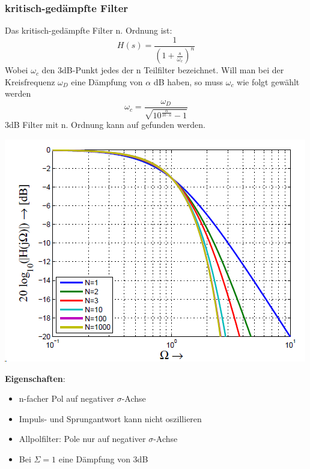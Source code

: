 \subsubsection{kritisch-gedämpfte Filter}
Das kritisch-gedämpfte Filter n. Ordnung ist:
\[
	H(s) = \frac{1}{\left(1 + \frac{s}{\omega_c}\right)^n}
\]
Wobei $\omega_c$ den 3dB-Punkt jedes der n Teilfilter bezeichnet. Will man bei der Kreisfrequenz $\omega_D$ eine Dämpfung von $\alpha$ dB haben, so muss $\omega_c$ wie folgt gewählt werden
\[
\omega_c = \frac{\omega_D}{\sqrt{10^{\frac{\alpha}{10\cdot n}}-1}}
\]
3dB Filter mit n. Ordnung kann auf  gefunden werden.
\begin{center}
	\includegraphics[width=0.6\columnwidth]{Images/kritisch}
\end{center}
\noindent\textbf{Eigenschaften}:
\begin{itemize}[nosep]
	\item n-facher Pol auf negativer $\sigma$-Achse
	\item Impuls- und Sprungantwort kann nicht oszillieren
	\item Allpolfilter: Pole nur auf negativer $\sigma$-Achse
	\item Bei $\Sigma=1$ eine Dämpfung von 3dB
\end{itemize}

